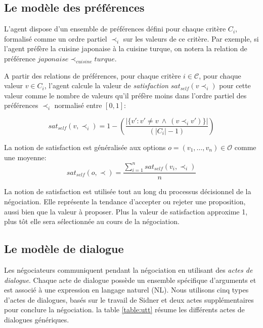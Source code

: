 \documentclass [french]{sig-alternate-05-2015}
\begin{document}
		\subsection{Le modèle des préférences}
			L'agent dispose d'un ensemble de préférences défini pour chaque critère $C_i$, formalisé comme un ordre partiel $ \prec_i$ sur les valeurs de ce critère. 
			Par exemple, si l'agent préfère la cuisine japonaise à la cuisine turque, on notera la relation de préférence $japonaise \prec_{cuisine} turque$. 
			
			A partir des relations de préférences, pour chaque critère $i\in \mathcal{C}$, pour chaque valeur $v\in C_i$, l'agent calcule la valeur de  \emph{satisfaction} $sat_{self}(v \prec_i)$ pour cette valeur comme le nombre de valeurs qu'il préfère moins dans l'ordre partiel des préférences $\prec_i$ normalisé entre $[0,1]$:
			
					\begin{equation}
					sat_{self}(v, \prec_i) =	1 - \left( \frac{|\{v' : v' \neq v \  \wedge \ (v \prec_i v')\}| }{( |C_i| - 1 )}\right)
					\end{equation}
					
			La notion de satisfaction est généralisée aux options $o= (v_1, \ldots, v_n)\in \mathcal{O}$ comme une moyenne: 
				\begin{equation}
				sat_{self}(o, \prec) = \frac{\sum_{i=1}^{n} sat_{self}(v_i, \prec_i) }{n}
				\end{equation}
				
			La notion de satisfaction est utilisée tout au long du processus décisionnel de la négociation. Elle représente la tendance d'accepter ou rejeter une proposition, aussi bien que la valeur à proposer. Plus la valeur de satisfaction approxime 1, plus tôt elle sera sélectionnée au cours de la négociation.
			 
			 
		\subsection{Le modèle de dialogue}
		\label {sec:com}
		Les négociateurs communiquent pendant la négociation en utilisant des \emph {actes de dialogue}. Chaque acte de dialogue possède un ensemble spécifique d'arguments et est associé à une expression en langage naturel (NL). Nous utilisons cinq types d'actes de dialogues, basés sur le travail de Sidner \cite {sidner1994artificial} et deux actes supplémentaires pour conclure la négociation. la table \ref {table:utt} résume les différents actes de dialogues  génériques. 
		
\end{document}

